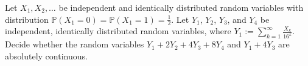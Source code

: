 Let $X_1,X_2,\ldots$ be independent and identically distributed random variables with distribution $\mathbb{P}(X_1=0)=\mathbb{P}(X_1=1)=\frac12$. Let $Y_1$, $Y_2$, $Y_3$, and $Y_4$ be independent, identically distributed random variables, where $Y_1:=\sum_{k=1}^\infty \frac{X_k}{16^k}$. Decide whether the random variables $Y_1+2Y_2+4Y_3+8Y_4$ and $Y_1+4Y_3$ are absolutely continuous.